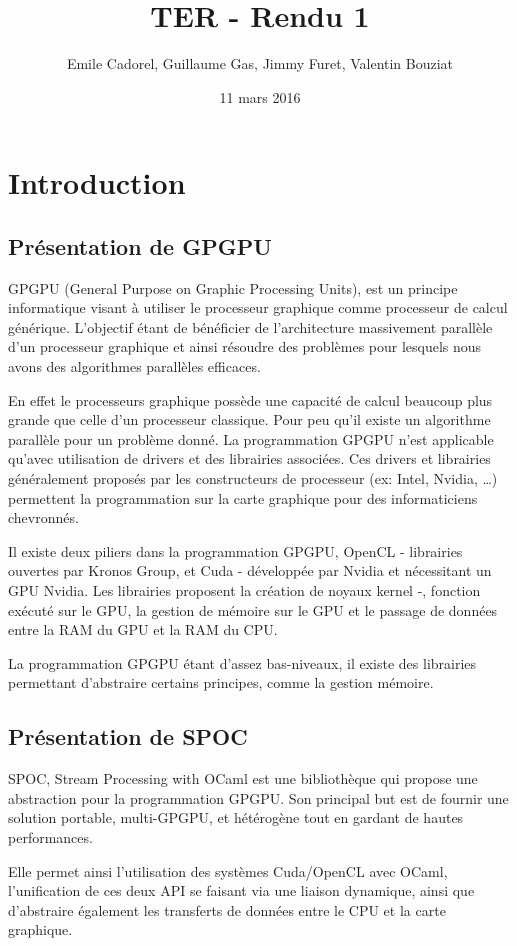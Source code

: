 \documentclass{report}
\title{TER - Rendu 1}
\author{Emile Cadorel, Guillaume Gas, Jimmy Furet, Valentin Bouziat}
\date{11 mars 2016}
\begin{document}
\maketitle

\chapter{Introduction}
\section{Présentation de GPGPU}
GPGPU (General Purpose on Graphic Processing Units), est un principe informatique visant à utiliser le processeur graphique comme processeur de calcul générique. L’objectif étant de bénéficier de l’architecture massivement parallèle d’un processeur graphique et ainsi résoudre des problèmes pour lesquels nous avons des algorithmes parallèles efficaces.

En effet le processeurs graphique possède une capacité de calcul beaucoup plus grande que celle d’un processeur classique. Pour peu qu’il existe un algorithme parallèle pour un problème donné. La programmation GPGPU n’est applicable qu’avec utilisation de drivers et des librairies associées. Ces drivers et librairies généralement proposés par les constructeurs de processeur (ex: Intel, Nvidia, …) permettent la programmation sur la carte graphique pour des informaticiens chevronnés. 

Il existe deux piliers dans la programmation GPGPU, OpenCL - librairies ouvertes par Kronos Group, et Cuda - développée par Nvidia et nécessitant un GPU Nvidia.
Les librairies proposent la création de noyaux  kernel -, fonction exécuté sur le GPU, la gestion de mémoire sur le GPU et le passage de données entre la RAM du GPU et la RAM du CPU.

La programmation GPGPU étant d’assez bas-niveaux, il existe des librairies permettant d’abstraire certains principes, comme la gestion mémoire. 

\section{Présentation de SPOC}
SPOC, Stream Processing with OCaml est une bibliothèque qui propose une abstraction pour la programmation GPGPU. Son principal but est de fournir une solution portable, multi-GPGPU, et hétérogène tout en gardant de hautes performances.

Elle permet ainsi l’utilisation des systèmes Cuda/OpenCL avec OCaml, l’unification de ces deux API se faisant via une liaison dynamique, ainsi que d’abstraire également les transferts de données entre le CPU et la carte graphique. 
\end{document}
